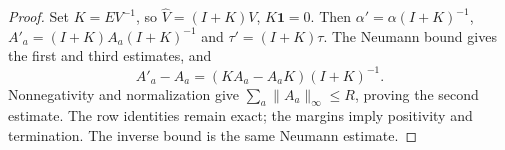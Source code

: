 \begin{proof}
Set $K=EV^{-1}$, so $\widehat V=(I+K)V$, $K\mathbf1=0$.
Then $\alpha'=\alpha(I+K)^{-1}$,
$A'_a=(I+K)A_a(I+K)^{-1}$ and $\tau'=(I+K)\tau$.
The Neumann bound gives the first and third estimates, and
\[
 A'_a-A_a=(KA_a-A_aK)(I+K)^{-1}.
\]
Nonnegativity and normalization give
$\sum_a\|A_a\|_\infty\le R$, proving the second estimate.
The row identities remain exact; the margins imply positivity and
termination. The inverse bound is the same Neumann estimate.
\end{proof}
